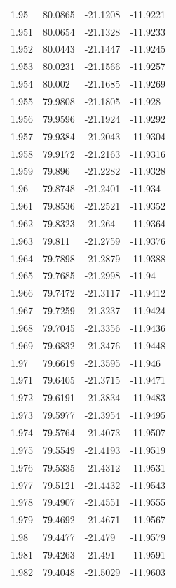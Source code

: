 \begin{tabular}{llll}
1.95 & 80.0865 & -21.1208 & -11.9221 \\
1.951 & 80.0654 & -21.1328 & -11.9233 \\
1.952 & 80.0443 & -21.1447 & -11.9245 \\
1.953 & 80.0231 & -21.1566 & -11.9257 \\
1.954 & 80.002 & -21.1685 & -11.9269 \\
1.955 & 79.9808 & -21.1805 & -11.928 \\
1.956 & 79.9596 & -21.1924 & -11.9292 \\
1.957 & 79.9384 & -21.2043 & -11.9304 \\
1.958 & 79.9172 & -21.2163 & -11.9316 \\
1.959 & 79.896 & -21.2282 & -11.9328 \\
1.96 & 79.8748 & -21.2401 & -11.934 \\
1.961 & 79.8536 & -21.2521 & -11.9352 \\
1.962 & 79.8323 & -21.264 & -11.9364 \\
1.963 & 79.811 & -21.2759 & -11.9376 \\
1.964 & 79.7898 & -21.2879 & -11.9388 \\
1.965 & 79.7685 & -21.2998 & -11.94 \\
1.966 & 79.7472 & -21.3117 & -11.9412 \\
1.967 & 79.7259 & -21.3237 & -11.9424 \\
1.968 & 79.7045 & -21.3356 & -11.9436 \\
1.969 & 79.6832 & -21.3476 & -11.9448 \\
1.97 & 79.6619 & -21.3595 & -11.946 \\
1.971 & 79.6405 & -21.3715 & -11.9471 \\
1.972 & 79.6191 & -21.3834 & -11.9483 \\
1.973 & 79.5977 & -21.3954 & -11.9495 \\
1.974 & 79.5764 & -21.4073 & -11.9507 \\
1.975 & 79.5549 & -21.4193 & -11.9519 \\
1.976 & 79.5335 & -21.4312 & -11.9531 \\
1.977 & 79.5121 & -21.4432 & -11.9543 \\
1.978 & 79.4907 & -21.4551 & -11.9555 \\
1.979 & 79.4692 & -21.4671 & -11.9567 \\
1.98 & 79.4477 & -21.479 & -11.9579 \\
1.981 & 79.4263 & -21.491 & -11.9591 \\
1.982 & 79.4048 & -21.5029 & -11.9603 \\

\end{tabular}
